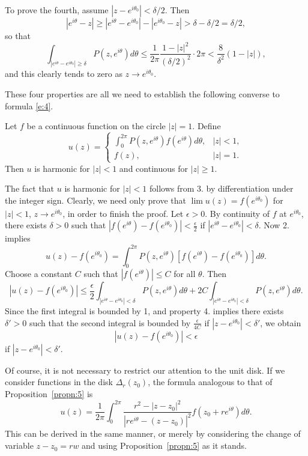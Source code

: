 \documentclass[a4paper,11pt]{article}
\begin{document}
To prove the fourth, assume $|z-e^{i\theta_0}| < \delta/2$.  Then
$$
|e^{i\theta} - z| \ge |e^{i\theta} - e^{i\theta_0}| - |e^{i\theta_0} -
z| > \delta - \delta/2 = \delta/2,
$$
so that
$$
\int_{|e^{i\theta} - e^{i\theta_0}| \ge \delta} P(z, e^{i\theta})
d\theta \le \frac{1}{2\pi} \frac{1-|z|^2}{(\delta/2)^2} \cdot 2\pi
< \frac{8}{\delta^2}(1-|z|),
$$
and this clearly tends to zero as $z \to e^{i\theta_0}$.

These four properties are all we need to establish the following
converse to formula \eqref{e:4}.

\begin{propn}
  \label{propn:5}
  Let $f$ be a continuous function on the circle $|z| = 1$.  Define
  $$
  u(z) =
  \begin{cases}
    \int_0^{2\pi} P(z,e^{i\theta}) f(e^{i\theta}) d\theta, & |z| <
    1,\\
    f(z), & |z| = 1.
  \end{cases}
  $$
  Then $u$ is harmonic for $|z| < 1$ and continuous for $|z| \ge 1$.
\end{propn}

\begin{myproof}
  The fact that $u$ is harmonic for $|z| < 1$ follows from 3. by
  differentiation under the integer sign.  Clearly, we need only prove
  that $\lim u(z) = f(e^{i\theta_0})$ for $|z| < 1$, $z \to
  e^{i\theta_0}$, in order to finish the proof.  Let $\epsilon > 0$.
  By continuity of $f$ at $e^{i\theta_0}$, there exists $\delta > 0$
  such that $|f(e^{i\theta}) - f(e^{i\theta_0})| < \frac{\epsilon}{2}$
  if $|e^{i\theta} - e^{i\theta_0}| < \delta$.  Now 2. implies
  $$
  u(z) - f(e^{i\theta_0}) = \int_0^{2\pi} P(z, e^{i\theta})
  [f(e^{i\theta}) - f(e^{i\theta_0})] d\theta.
  $$
  Choose a constant $C$ such that $|f(e^{i\theta})| \le C$ for all
  $\theta$.  Then
  $$
  |u(z) - f(e^{i\theta_0})|
  \le \frac{\epsilon}{2}\int_{|e^{i\theta}-e^{i\theta_0}|< \delta}
  P(z, e^{i\theta})d\theta 
  + 2C \int_{|e^{i\theta}-e^{i\theta_0}|< \delta}
  P(z, e^{i\theta})d\theta.
  $$
  Since the first integral is bounded by 1, and property 4. implies
  there exists $\delta' > 0$ such that the second integral is bounded
  by $\frac{\epsilon}{4C}$ if $|z - e^{i\theta_0}| < \delta'$, we
  obtain
  $$
  |u(z) - f(e^{i\theta_0})| < \epsilon
  $$
  if $|z - e^{i\theta_0}| < \delta'$.
\end{myproof}

Of course, it is not necessary to restrict our attention to the unit
disk.  If we consider functions in the disk $\Delta_r(z_0)$, the
formula analogous to that of Proposition~\ref{propn:5} is
$$
u(z) = \frac{1}{2\pi} \int_0^{2\pi} \frac{r^2 - |z-z_0|^2}{
|re^{i\theta} - (z-z_0)|^2} f(z_0 + re^{i\theta}) d\theta.
$$
This can be derived in the same manner, or merely by considering the
change of variable $z - z_0 = rw$ and using Proposition~\ref{propn:5}
as it stands.
\end{document}
